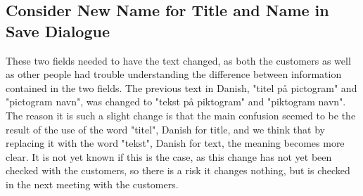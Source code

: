 \subsection{Consider New Name for Title and Name in Save Dialogue}
These two fields needed to have the text changed, as both the customers as well as other people had trouble understanding the difference between information contained in the two fields.
The previous text in Danish, "titel på pictogram" and "pictogram navn", was changed to "tekst på piktogram" and "piktogram navn". 
The reason it is such a slight change is that the main confusion seemed to be the result of the use of the word "titel", Danish for title, and we think that by replacing it with the word "tekst", Danish for text, the meaning becomes more clear. 
It is not yet known if this is the case, as this change has not yet been checked with the customers, so there is a risk it changes nothing, but is checked in the next meeting with the customers.